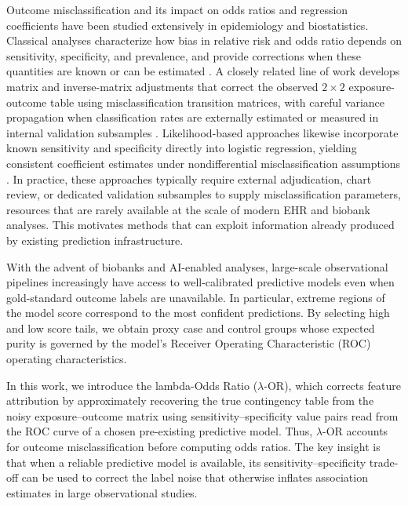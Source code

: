 \documentclass[pdflatex,sn-mathphys-num]{sn-jnl}%
\newcommand{\SPOR}{\textrm{$\lambda$-OR}}
\theoremstyle{thmstyleone}%
\theoremstyle{thmstyletwo}%
\theoremstyle{thmstylethree}%
\begin{document}
Outcome misclassification and its impact on odds ratios and regression coefficients have been studied extensively in epidemiology and biostatistics. Classical analyses characterize how bias in relative risk and odds ratio depends on sensitivity, specificity, and prevalence, and provide corrections when these quantities are known or can be estimated \cite{copeland1977misclassification,greenland1988sensitivity}. A closely related line of work develops matrix and inverse-matrix adjustments that correct the observed $2\times 2$ exposure-outcome table using misclassification transition matrices, with careful variance propagation when classification rates are externally estimated or measured in internal validation subsamples \cite{greenland1988variance,morrissey1999matrix}. Likelihood-based approaches likewise incorporate known sensitivity and specificity directly into logistic regression, yielding consistent coefficient estimates under nondifferential misclassification assumptions \cite{magder1997uncertainty,neuhaus1999bias}. In practice, these approaches typically require external adjudication, chart review, or dedicated validation subsamples to supply misclassification parameters, resources that are rarely available at the scale of modern EHR and biobank analyses. This motivates methods that can exploit information already produced by existing prediction infrastructure.

With the advent of biobanks and AI-enabled analyses, large-scale observational pipelines increasingly have access to well-calibrated predictive models even when gold-standard outcome labels are unavailable. In particular, extreme regions of the model score correspond to the most confident predictions. By selecting high and low score tails, we obtain proxy case and control groups whose expected purity is governed by the model’s Receiver Operating Characteristic (ROC) operating characteristics.

In this work, we introduce the lambda-Odds Ratio ($\SPOR$), which corrects feature attribution by approximately recovering the true contingency table from the noisy exposure--outcome matrix using sensitivity--specificity value pairs read from the ROC curve of a chosen pre-existing predictive model. Thus, $\SPOR$ accounts for outcome misclassification before computing odds ratios. The key insight is that when a reliable predictive model is available, its sensitivity--specificity trade-off can be used to correct the label noise that otherwise inflates association estimates in large observational studies.
\end{document}
